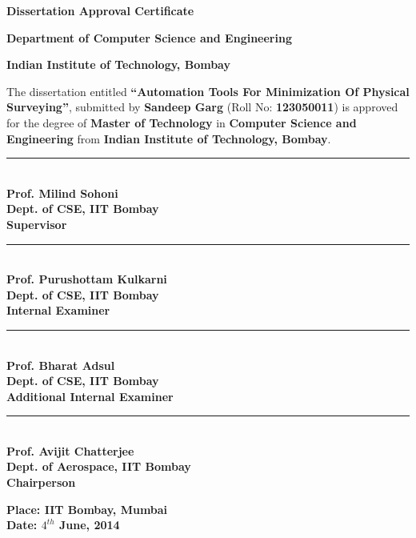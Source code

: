 \documentclass[a4paper,11pt]{report}
\begin{document}
\newpage
\begin{center} \textbf{\Large{Dissertation Approval Certificate}} \end{center}
\begin{center}\textbf{Department of Computer Science and Engineering}\end{center}
\begin{center}\textbf{Indian Institute of Technology, Bombay}\end{center}
\vspace{18pt}
\noindent The dissertation entitled
\textbf{``Automation Tools For Minimization Of Physical Surveying''}, submitted by
\textbf{Sandeep Garg} (Roll No: \textbf{123050011}) is approved for the degree of \textbf{Master of Technology} in
\textbf{Computer Science and Engineering} from \textbf{Indian Institute of Technology, Bombay}.

\vspace{90pt}


\begin{center}

    \rule{180pt}{1pt} \\
    \textbf{Prof. Milind Sohoni} \\
    \textbf{Dept. of CSE, IIT Bombay} \\
    \textbf{Supervisor}

\end{center}


\vspace{90pt}

\begin{center}
  \begin{minipage}{180pt}
    \rule{180pt}{1pt} \\
    \textbf{Prof. Purushottam Kulkarni} \\
    \textbf{Dept. of CSE, IIT Bombay} \\
    \textbf{Internal Examiner}
  \end{minipage}
  \hspace{50pt}
  \begin{minipage}{180pt}
    \begin{flushright}
      \rule{180pt}{1pt} \\
      \textbf{Prof. Bharat Adsul} \\
      \textbf{Dept. of CSE, IIT Bombay} \\
      \textbf{Additional Internal Examiner}
    \end{flushright}
  \end{minipage}
\end{center}


\vspace{90pt}
\begin{center}
  \rule{180pt}{1pt} \\
  \textbf{Prof. Avijit Chatterjee} \\
  \textbf{Dept. of Aerospace, IIT Bombay} \\
  \textbf{Chairperson} \\
\end{center}

\vspace{20pt}
\noindent
\textbf{Place: IIT Bombay, Mumbai} \\
\textbf{Date: $4^{th}$ June, 2014}
\end{document}
